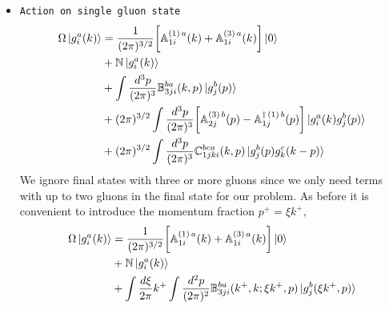 \documentclass[aps,prd,amsmath,amssymb,nofootinbib]{revtex4-2}
\def\mf#1{\mathbb{#1}}
\numberwithin{equation}{section}
\begin{document}
\begin{itemize}
\begin{align}
   +\frac{1}{2\pi}\int dp^{+}\,  dq^{+} \, \int d^{2}z\, d^{2}x\, \mf{B}^{cb}_{2kj}(p^{+},-z;q^{+},-x)\ket{g^{b}_{j}(p^{+},z)g^{c}_{k}(q^{+},x)}%
\end{align}
Similarly, changing to the momentum fraction,  
\begin{align} \label{Omegaonvacposzeta}
    \Omega\ket{0} & = \mf{N}\ket{0} \notag \\ &
    + \frac{1}{(2\pi)^{1/2}}\int dp^{+} \int d^{2}x\,
    \bigg[\mf{A}^{(3)\, b}_{2j}(p^{+}, -x)
   -\mf{A}^{\dagger\,(1)\, b}_{1j}(p^{+},x)\bigg]\ket{g^{b}_{j}(p^{+},x)} \notag \\ & 
 +\frac{1}{2\pi}\int dk^{+} k^+  \int d \xi  \int d^{2}z d^{2}x\, \mf{B}^{cb}_{2kj}(\xi k^{+},-z; (1-\xi) k^{+},-x)\ket{g^{b}_{j}(\xi k^{+},z),\,g^{c}_{k}((1-\xi)k^{+},x)}
\end{align}
These relations will help us fix coefficients $ \mf{N}$, $\mf{A}^{(1)}$, $\mf{A}^{(3)}$ and $\mf{B}_{2}$. 
The remaining two coefficients can be fixed by considering $\Omega$ acting on a single gluon state. 
\item{\texttt{Action on single gluon state}} 
\begin{align}\label{Omegaongmom}
    \Omega\ket{g^{a}_{i}(k)} & =  \frac{1}{(2\pi)^{3/2}} \bigg[\mf{A}^{(1)\, a}_{1i}(k)+\mf{A}^{(3)\, a}_{1i}(k)\bigg]\ket{0} \notag \\ &
   + \mf{N}\ket{g^{a}_{i}(k)} \notag \\ & 
    +\int  \frac{d^3p}{(2\pi)^3} \mf{B} ^{ba}_{3ji}(k,p)\ket{g^{b}_{j}(p)} \notag \\ & 
    + (2\pi)^{3/2}\int \frac{d^3p}{(2\pi)^3}  \bigg[\mf{A}^{(3)\, b}_{2j}(p) - \mf{A}^{\dagger\, (1)\, b}_{1j}(p)\bigg]  \ket{g^{a}_{i}(k)g^{b}_{j}(p)} \notag \\ & 
    + (2\pi)^{3/2}\int \frac{d^3p}{(2\pi)^3} \mf{C}^{bca}_{1jki}(k,p)\ket{g^{b}_{j}(p)g^{c}_{k}(k-p)}
\end{align}
We ignore final states with three or more gluons since we only need terms with up to two gluons in the final state for our problem. As before it is convenient to introduce the momentum fraction  $p^{+} = \xi k^{+}$,
\begin{align}\label{Omegaongmomzeta}
    \Omega\ket{g^{a}_{i}(k)} & = \frac{1}{(2\pi)^{3/2}} \bigg[\mf{A}^{(1)\, a}_{1i}( k)+\mf{A}^{(3)\, a}_{1i}(k)\bigg]\ket{0} \notag \\ & 
   +  \mf{N}\ket{g^{a}_{i}(k)} \notag \\ & 
    + \int \frac{d\xi}{2\pi}k^{+}\int  \frac{d^{2}p}{(2\pi)^2} \mf{B} ^{ba}_{3ji}(k^{+},k; \xi k^{+},p)\ket{g^{b}_{j}(\xi k^{+},p)} \notag \\ & 

\end{align}
\end{itemize}
\end{document}

